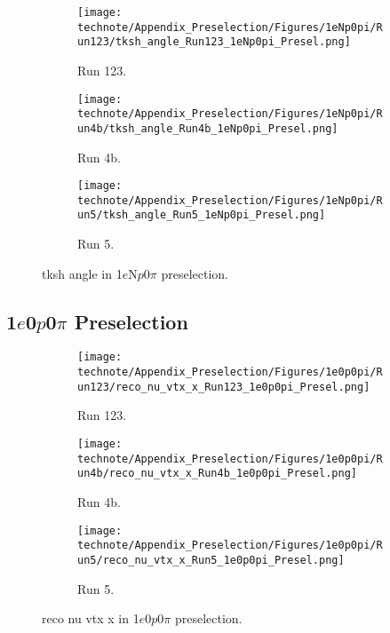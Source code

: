 \begin{figure}[H]
    \centering
    \begin{subfigure}[t]{0.32\linewidth}
        \texttt{[image: technote/Appendix\_Preselection/Figures/1eNp0pi/Run123/tksh\_angle\_Run123\_1eNp0pi\_Presel.png]}
        \caption{Run 123.}
    \end{subfigure}%
    \hspace{0.2cm}%
    \begin{subfigure}[t]{0.32\linewidth}
        \texttt{[image: technote/Appendix\_Preselection/Figures/1eNp0pi/Run4b/tksh\_angle\_Run4b\_1eNp0pi\_Presel.png]}
        \caption{Run 4b.}
    \end{subfigure}%
    \hspace{0.2cm}%
    \begin{subfigure}[t]{0.32\linewidth}
        \texttt{[image: technote/Appendix\_Preselection/Figures/1eNp0pi/Run5/tksh\_angle\_Run5\_1eNp0pi\_Presel.png]}
        \caption{Run 5.}
    \end{subfigure}
    \caption{tksh angle in 1$e$N$p$0$\pi$ preselection.}
\end{figure}

\subsection{1$e$0$p$0$\pi$ Preselection}
\label{appendix:0p0pi_preselection}

\begin{figure}[H]
    \centering
    \begin{subfigure}[t]{0.32\linewidth}
        \texttt{[image: technote/Appendix\_Preselection/Figures/1e0p0pi/Run123/reco\_nu\_vtx\_x\_Run123\_1e0p0pi\_Presel.png]}
        \caption{Run 123.}
    \end{subfigure}%
    \hspace{0.2cm}%
    \begin{subfigure}[t]{0.32\linewidth}
        \texttt{[image: technote/Appendix\_Preselection/Figures/1e0p0pi/Run4b/reco\_nu\_vtx\_x\_Run4b\_1e0p0pi\_Presel.png]}
        \caption{Run 4b.}
    \end{subfigure}%
    \hspace{0.2cm}%
    \begin{subfigure}[t]{0.32\linewidth}
        \texttt{[image: technote/Appendix\_Preselection/Figures/1e0p0pi/Run5/reco\_nu\_vtx\_x\_Run5\_1e0p0pi\_Presel.png]}
        \caption{Run 5.}
    \end{subfigure}
    \caption{reco nu vtx x in 1$e$0$p$0$\pi$ preselection.}
\end{figure}

